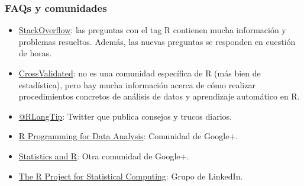 \documentclass{beamer}
\begin{document}
\begin{frame}
\frametitle{FAQs y comunidades}
\begin{itemize}
\item \href{http://stackoverflow.com/questions/tagged/r}{StackOverflow}: las preguntas con el tag R contienen mucha información y problemas resueltos. Además, las nuevas preguntas se responden en cuestión de horas.

\item \href{http://stats.stackexchange.com/}{CrossValidated}: no es una comunidad específica de R (más bien de estadística), pero hay mucha información acerca de cómo realizar procedimientos concretos de análisis de datos y aprendizaje automático en R.

\item \href{https://twitter.com/RLangTip}{@RLangTip}: Twitter que publica consejos y trucos diarios.

\item \href{https://plus.google.com/u/0/communities/115516770321395255377}{R Programming for Data Analysis}: Comunidad de Google+.
\item \href{https://plus.google.com/u/0/communities/117681470673972651781}{Statistics and R}: Otra comunidad de Google+.
\item \href{https://www.linkedin.com/grp/home?gid=77616}{The R Project for Statistical Computing}: Grupo de LinkedIn.
\end{itemize}
\end{frame}
\end{document}
